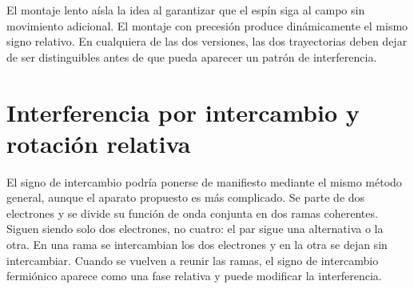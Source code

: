 \begin{classroomqa}
\end{classroomqa}

El montaje lento aísla la idea al garantizar que el espín siga al campo sin movimiento adicional. El montaje con precesión produce dinámicamente el mismo signo relativo. En cualquiera de las dos versiones, las dos trayectorias deben dejar de ser distinguibles antes de que pueda aparecer un patrón de interferencia.

\begin{classroomqa}
\end{classroomqa}

\begin{classroomqa}
\end{classroomqa}

\section{Interferencia por intercambio y rotación relativa}

El signo de intercambio podría ponerse de manifiesto mediante el mismo método general, aunque el aparato propuesto es más complicado. Se parte de dos electrones y se divide su función de onda conjunta en dos ramas coherentes. Siguen siendo solo dos electrones, no cuatro: el par sigue una alternativa o la otra. En una rama se intercambian los dos electrones y en la otra se dejan sin intercambiar. Cuando se vuelven a reunir las ramas, el signo de intercambio fermiónico aparece como una fase relativa y puede modificar la interferencia.

